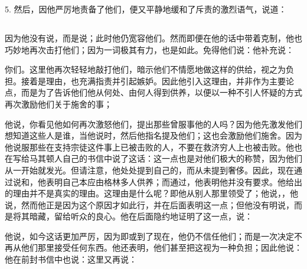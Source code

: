5. 然后，因他严厉地责备了他们，便又平静地缓和了斥责的激烈语气，说道：\par


\subsection{}

\par

因为他没有说，而是说；此时他仍宽容他们。然而即便在他的话中带着克制，他也巧妙地再次击打他们；因为一词极其有力，也是如此。免得他们说：他补充说：\par

你们。这里他再次轻轻地敲打他们，暗示他们不情愿地做这样的供给，视之为负担。接着是理由，也充满指责并引起嫉妒。因此他引入这理由，并非作为主要论点，而是为了告诉他们他从何处、由何人得到供养，以便以一种不引人怀疑的方式再次激励他们关于施舍的事；\par

他说，你看见他如何再次激怒他们，提出那些曾服事他的人吗？因为他先激发他们想知道这些人是谁，当他说时，然后他指名提及他们；这也会激励他们施舍。因为他说服那些在支持宗徒这件事上已被击败的人，不要在救济穷人上也被击败。他也在写给马其顿人自己的书信中说了这话：这一点也是对他们极大的称赞，因为他们从一开始就发光。但请注意，他处处提到自己的，而从未提到奢侈。因此，现在通过说和，他表明自己本应由格林多人供养；而通过，他表明他并没有要求。他给出的理由并不是真实的理由。这理由是什么呢？即他从别人那里领受了；他说，，他说，然而他正是因为这个原因才如此行，并在后面表明这一点；但他没有明说，而是将其暗藏，留给听众的良心。他在后面隐约地证明了这一点，说：\par

他说，如今这话更加严厉，因为即或到了现在，他仍不信任他们；而是一次决定不再从他们那里接受任何东西。他还表明，他们甚至把这视为一种负担；因此他说：他在前封书信中也说：这里又再说：\par

